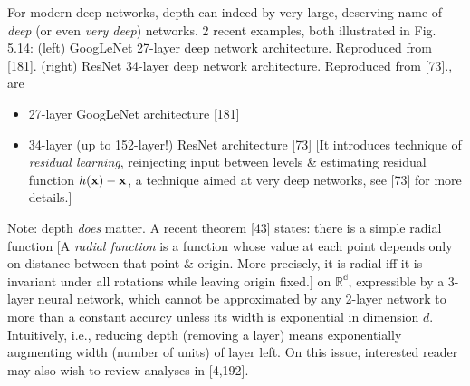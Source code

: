 \documentclass{article}
\begin{document}
\begin{itemize}
\begin{itemize}
\begin{itemize}
			For modern deep networks, depth can indeed by very large, deserving name of {\it deep} (or even {\it very deep}) networks. 2 recent examples, both illustrated in {\sf Fig. 5.14: (left) GoogLeNet 27-layer deep network architecture. Reproduced from [181]. (right) ResNet 34-layer deep network architecture. Reproduced from [73].}, are
			\begin{itemize}
				\item 27-layer GoogLeNet architecture [181]
				\item 34-layer (up to 152-layer!) ResNet architecture [73] [It introduces technique of {\it residual learning}, reinjecting input between levels \& estimating residual function $h({\bf x}) - {\bf x}$, a technique aimed at very deep networks, see [73] for more details.]
			\end{itemize}
			Note: depth {\it does} matter. A recent theorem [43] states: there is a simple radial function [A {\it radial function} is a function whose value at each point depends only on distance between that point \& origin. More precisely, it is radial iff it is invariant under all rotations while leaving origin fixed.] on $\mathbb{R^d}$, expressible by a 3-layer neural network, which cannot be approximated by any 2-layer network to more than a constant accurcy unless its width is exponential in dimension $d$. Intuitively, i.e., reducing depth (removing a layer) means exponentially augmenting width (number of units) of layer left. On this issue, interested reader may also wish to review analyses in [4,192].
			

\end{itemize}
\end{itemize}
\end{itemize}
\end{document}
